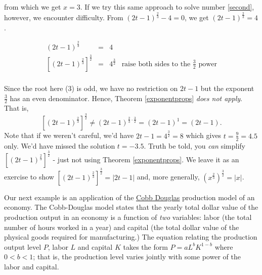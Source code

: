 \documentclass{ximera}
\begin{document}
from which we get $x = 3$.  If we try this same approach to solve number \ref{second}, however, we encounter difficulty.  From $(2t-1)^{\frac{2}{3}} -4 = 0$, we get $(2t-1)^{\frac{2}{3}}  =4$.  

\[ \begin{array}{rclr}  

(2t-1)^{\frac{2}{3}} & = & 4 & \\

 \left[(2t-1)^{\frac{2}{3}}  \right]^{\frac{3}{2}} & = & 4^{\frac{3}{2}}& \text{raise both sides to the $\frac{3}{2}$ power} \\ \end{array} \]
 
 Since the root here ($3$) is odd, we have no restriction on $2t-1$ but the exponent $\frac{3}{2}$ has an even denominator.  Hence, Theorem \ref{exponentprops} \textit{does not apply}.  That is, \[\left[(2t-1)^{\frac{2}{3}}  \right]^{\frac{3}{2}} \neq (2t-1)^{\frac{2}{3} \cdot \frac{3}{2}} = (2t-1)^{1} = (2t-1).\]
 Note that if we weren't careful, we'd have $2t-1 = 4^{\frac{3}{2}} = 8$ which gives $t= \frac{9}{2} = 4.5$ only.   We'd have missed the solution $t = -3.5$.  Truth be told, you \textit{can} simplify $\left[(2t-1)^{\frac{2}{3}}  \right]^{\frac{3}{2}} $ - just not using Theorem \ref{exponentprops}.  We leave it as an exercise to show  $\left[(2t-1)^{\frac{2}{3}}  \right]^{\frac{3}{2}} = |2t-1|$ and, more generally, $\left(x^{\frac{2}{3}}\right)^{\frac{3}{2}} = |x|$.
 
 Our next example is an application of the  \href{https://en.wikipedia.org/wiki/Cobb-Douglas_production_function}{\underline{Cobb Douglas}} production model of an economy.  The Cobb-Douglas model states that the yearly total dollar value of the production output in an economy is a function of \textit{two} variables:   labor (the total number of hours worked in a year) and capital (the total dollar value of the physical goods required for manufacturing.) The equation relating the production output level $P$, labor $L$ and capital $K$ takes the form $P = a L^{b} K^{1-b}$ where $0 < b < 1$; that is, the production level varies jointly with some power of the labor and capital.  
\end{document}
